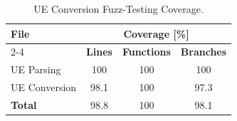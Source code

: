 \begin{table}[ht]
  \centering
  \begin{tabular}{l c c c}
    \toprule
    \multirow{2}{*}[-2pt]{\textbf{File}} & \multicolumn{3}{c}{\textbf{Coverage} [\%]}\\
    \cmidrule{2-4}
    & \textbf{Lines} & \textbf{Functions} & \textbf{Branches}\\
    \midrule
    UE Parsing & 100 & 100 & 100\\
    UE Conversion & 98.1 & 100 & 97.3\\
    \midrule
    \textbf{Total} & 98.8 & 100 & 98.1\\
    \bottomrule
  \end{tabular}
  \caption{UE Conversion Fuzz-Testing Coverage.}
\end{table}
